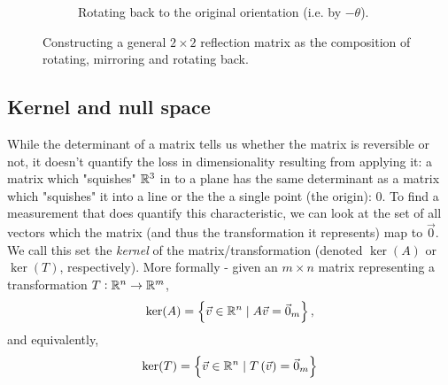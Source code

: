 \begin{figure}[]
	\begin{subfigure}[c]{0.45\textwidth}
		\caption{Rotating back to the original orientation (i.e. by $-\theta$).}
	\end{subfigure}
	\caption{Constructing a general $2\times2$ reflection matrix as the composition of rotating, mirroring and rotating back.}
	\label{fig:building_reflect_2x2}
\end{figure}

\subsection{Kernel and null space}
While the determinant of a matrix tells us whether the matrix is reversible or not, it doesn't quantify the loss in dimensionality resulting from applying it: a matrix which "squishes" $\Rs[3]$ in to a plane has the same determinant as a matrix which "squishes" it into a line or the the a single point (the origin): $0$. To find a measurement that does quantify this characteristic, we can look at the set of all vectors which the matrix (and thus the transformation it represents) map to $\vec{0}$. We call this set the \emph{kernel} of the matrix/transformation (denoted $\ker(A)$ or $\ker(T)$, respectively). More formally - given an $m\times n$ matrix representing a transformation $T:\Rs[n]\to\Rs[m]$,
\begin{equation}
	\ker(A) = \left\{ \vec{v}\in\Rs[n] \mid A\vec{v}=\vec{0}_{m} \right\},
	\label{eq:kernel_matrix}
\end{equation}
and equivalently,
\begin{equation}
	\ker(T) = \left\{ \vec{v}\in\Rs[n] \mid T \left( \vec{v} \right) =\vec{0}_{m} \right\}
	\label{eq:kernel_transformation}
\end{equation}

